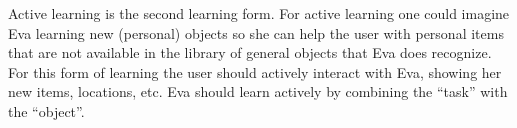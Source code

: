 \documentclass[project_eva.tex]{subfiles}
\begin{document}
\label{sec:Concept}
Active learning is the second learning form. For active learning one could imagine Eva learning new (personal) objects so 
she can help the user with personal items that are not available in the library of general objects that Eva does recognize. 
For this form of learning the user should actively interact with Eva, showing her new items, locations, etc. Eva should 
learn actively by combining the ``task'' with the ``object''. 
\end{document}
